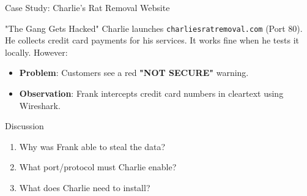 \documentclass[aspectratio=169]{beamer}  %
\begin{document}
\begin{frame}{Case Study: Charlie's Rat Removal Website}
    \begin{casestudy}{"The Gang Gets Hacked"}
        \small
        Charlie launches \texttt{charliesratremoval.com} (Port 80). He collects credit card payments for his services. It works fine when he tests it locally. However:
        \begin{itemize}
            \item \textbf{Problem}: Customers see a red \textbf{"NOT SECURE"} warning.
            \item \textbf{Observation}: Frank intercepts credit card numbers in cleartext using Wireshark.
        \end{itemize}
    \end{casestudy}
    
    \begin{block}{Discussion}
        \small
        \begin{enumerate}
            \item Why was Frank able to steal the data?
            \item What port/protocol must Charlie enable?
            \item What does Charlie need to install?
        \end{enumerate}
    \end{block}
\end{frame}
\end{document}
